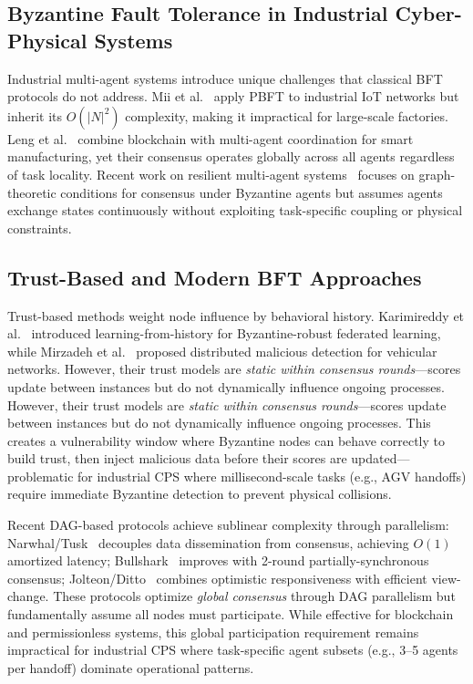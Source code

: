 \documentclass[lettersize,journal]{IEEEtran}
\begin{document}
\subsection{Byzantine Fault Tolerance in Industrial Cyber-Physical Systems}

Industrial multi-agent systems introduce unique challenges that classical BFT protocols do not address. Mii et al.~\cite{mivsic2020adapting} apply PBFT to industrial IoT networks but inherit its $O(|N|^2)$ complexity, 
making it impractical for large-scale factories. Leng et al.~\cite{leng2019manuchain} combine blockchain with multi-agent coordination for smart manufacturing, yet their consensus operates globally across all agents regardless of task locality. Recent work on resilient multi-agent systems~\cite{pirani2022survey} focuses on graph-theoretic conditions for consensus under Byzantine agents but assumes agents exchange states continuously without exploiting task-specific coupling or physical constraints.

\subsection{Trust-Based and Modern BFT Approaches}

Trust-based methods weight node influence by behavioral history. Karimireddy et al.~\cite{karimireddy2021learning} introduced learning-from-history for Byzantine-robust federated learning, while Mirzadeh et al.~\cite{mirzadeh2022filtering} proposed distributed malicious detection for vehicular networks. However, their trust models are \textit{static within consensus rounds}—scores update between instances but do not dynamically influence ongoing processes. However, their trust models are \textit{static within consensus rounds}—scores update between instances but do not dynamically influence ongoing processes. 
This creates a vulnerability window where Byzantine nodes can behave correctly to build trust, then inject malicious data before their scores are updated—problematic for industrial CPS where millisecond-scale tasks (e.g., AGV handoffs) require immediate Byzantine detection to prevent physical collisions.

Recent DAG-based protocols achieve sublinear complexity through parallelism: 
Narwhal/Tusk~\cite{danezis2022narwhal} decouples data dissemination from consensus, achieving $O(1)$ amortized latency; Bullshark~\cite{spiegelman2022bullshark} improves with 2-round partially-synchronous consensus; Jolteon/Ditto~\cite{gelashvili2022jolteon} combines optimistic responsiveness with efficient view-change. 
These protocols optimize \textit{global consensus} through DAG parallelism but fundamentally assume all nodes must participate. While effective for blockchain and permissionless systems, this global participation requirement remains impractical for industrial CPS where task-specific agent subsets (e.g., 3--5 agents per handoff) dominate operational patterns.
\end{document}
